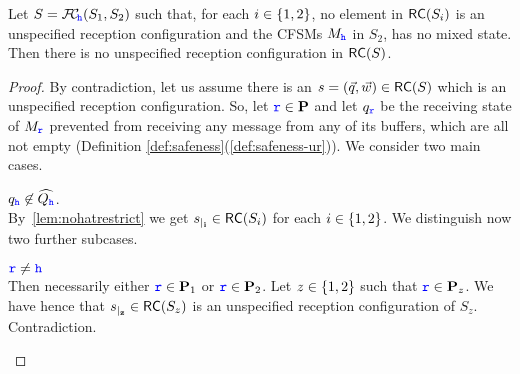 \begin{proposition}%
\label{prop:nurPreservation}
Let $S = {\mathcal{F}\!\mathcal{C}}_{\!{\mathtt{\color{blue}{ {h}}}}}(S_1,S_2)$ such that, for each $i\in \{1,2\}$, 
no element in $\mathsf{RC}(S_{i})$ is an unspecified reception configuration 
and the CFSMs $M_{{\mathtt{\color{blue}{ {h}}}}}$ in $S_2$, has no mixed state.
Then there is no unspecified reception configuration in $\mathsf{RC}(S)$.
\end{proposition}



\begin{proof}
By contradiction, let us assume there is an $s= (\vec{q},\vec{w})\in \mathsf{RC}(S)$ which is an unspecified reception configuration.
So, let ${\mathtt{\color{blue}{ {r}}}} \in \mathbf{P}$ and let ${q}_{\mathtt{\color{blue}{ {r}}}}$  be the receiving state of $M_{\mathtt{\color{blue}{ {r}}}}$ prevented from 
receiving any message from any of its buffers, which are all not empty (Definition \ref{def:safeness}(\ref{def:safeness-ur})).
We consider two main cases.
\begin{description}
%
\item 
${q}_{\mathtt{\color{blue}{ {h}}}}\not\in \widehat{Q_{\mathtt{\color{blue}{ {h}}}}}$.\\ 
By~\cref{lem:nohatrestrict} we get ${s}_{\mid_{\mathbf{i}}}\in \mathsf{RC}(S_i)$ for each $i\in\{1,2\}$.
We distinguish now two further subcases.

${\mathtt{\color{blue}{ {r}}}} \neq { \ensuremath{\mathtt{\color{blue}{ {h}}}} }$\\
Then necessarily either ${\mathtt{\color{blue}{ {r}}}}\in\mathbf{P}_1$ or ${\mathtt{\color{blue}{ {r}}}}\in\mathbf{P}_2$.
Let $z\in\{1,2\}$ such that ${\mathtt{\color{blue}{ {r}}}}\in\mathbf{P}_z$. We have hence that ${s}_{\mid_{\mathbf{z}}}\in \mathsf{RC}(S_z)$ is an unspecified reception configuration of $S_z$. Contradiction.


\end{description}
\end{proof}
